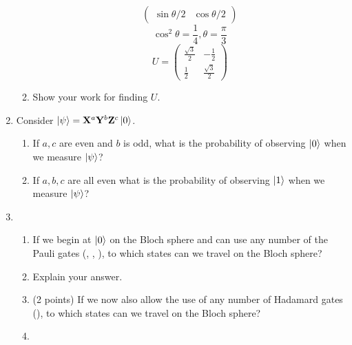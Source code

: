 \documentclass[12pt]{article}
\begin{document}
\begin{enumerate}[font=\bfseries]
\begin{enumerate}[label=\theenumi.\arabic*]
{\[\begin{pmatrix}
        \sin{\theta/2} & \cos{\theta/2}
        \end{pmatrix}\]
        \[\cos^2{\theta} = \frac{1}{4}, \theta = \frac{\pi}{3}\]
        \[U = \begin{pmatrix} 
        \frac{\sqrt{3}}{2} & -\frac{1}{2} \\
        \frac{1}{2} & \frac{\sqrt{3}}{2}
            \end{pmatrix}
        \]}
    \item {} Show your work for finding $U$. 
    \end{enumerate}
    \item {} Consider $\ket{\psi} = \mathbf{X}^a\mathbf{Y}^b\mathbf{Z}^c\ket{0}$.
    \begin{enumerate}[label=\theenumi.\arabic*]
        \item {} If $a,c$ are even and $b$ is odd, what is the probability of observing $\ket{0}$ when we measure $\ket{\psi}$? 
        \item {} If $a,b,c$ are all even what is the probability of observing $\ket{1}$ when we measure $\ket{\psi}$? 
    \end{enumerate}
    \item {}
    \begin{enumerate}[label=\theenumi.\arabic*] \item {} If we begin at $\ket{0}$ on the Bloch sphere and can use any number of the Pauli gates (\PauliX{}, \PauliY{}, \PauliZ{}), to which states can we travel on the Bloch sphere? 
    \item {} Explain your answer. 
    
    \item (2 points) If we now also allow the use of any number of Hadamard gates (\Hadamard{}), to which states can we travel on the Bloch sphere? 
    \item {} 
    

\end{enumerate}
\end{enumerate}
\end{document}
